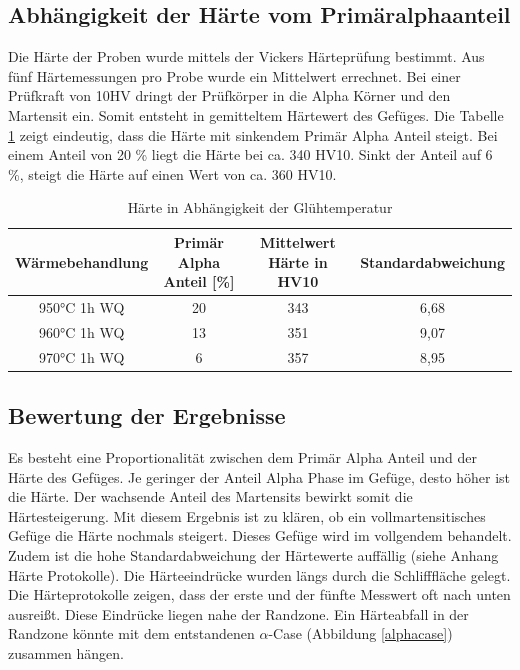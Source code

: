 \documentclass[a4paper, 11pt]{tubsreprt}
\begin{document}
\subsection{Abhängigkeit der Härte vom Primäralphaanteil}
Die Härte der Proben wurde mittels der Vickers Härteprüfung bestimmt. Aus fünf Härtemessungen pro Probe wurde ein Mittelwert errechnet. Bei einer Prüfkraft von 10HV dringt der Prüfkörper in die Alpha Körner und den Martensit ein. Somit entsteht in gemitteltem Härtewert des Gefüges. Die Tabelle \ref{Härte in Abhängigkeit der Glühtemperatur} zeigt eindeutig, dass die Härte mit sinkendem Primär Alpha Anteil steigt. Bei einem Anteil von 20 \% liegt die Härte bei ca. 340 HV10. Sinkt der Anteil auf 6 \%, steigt die Härte auf einen Wert von ca. 360 HV10.

\begin{table}	%
\begin{tabular}{c|c|c|c}
Wärmebehandlung	& Primär Alpha Anteil [\%] &	Mittelwert 
Härte in HV10 	& Standardabweichung \\
\hline
950°C 1h WQ	& 	20	&	343	&	6,68 \\
960°C 1h WQ	&	13	&	351	&	9,07 \\
970°C 1h WQ	&	6	&	357	&	8,95 \\

\end{tabular}
\caption{Härte in Abhängigkeit der Glühtemperatur}
\label{Härte in Abhängigkeit der Glühtemperatur}
\end{table}
\subsection{Bewertung der Ergebnisse}
Es besteht eine Proportionalität zwischen dem Primär Alpha Anteil und der Härte des Gefüges. Je geringer der Anteil Alpha Phase im Gefüge, desto höher ist die Härte. Der wachsende Anteil des Martensits bewirkt somit die Härtesteigerung. Mit diesem Ergebnis ist zu klären, ob ein vollmartensitisches Gefüge die Härte nochmals steigert. Dieses Gefüge wird im vollgendem behandelt.
Zudem ist die hohe Standardabweichung der Härtewerte auffällig (siehe Anhang Härte Protokolle). Die Härteeindrücke wurden längs durch die Schlifffläche gelegt. Die Härteprotokolle zeigen, dass der erste und der fünfte Messwert oft nach unten ausreißt. Diese Eindrücke liegen nahe der Randzone. Ein Härteabfall in der Randzone könnte mit dem entstandenen $\alpha$-Case (Abbildung \ref{alphacase}) zusammen hängen.   
\end{document}
